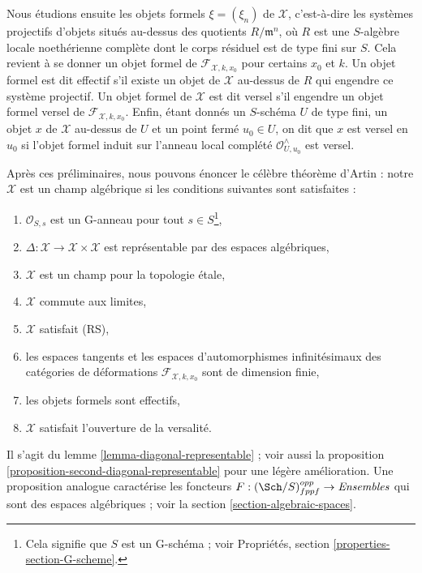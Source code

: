 \medskip\noindent
Nous étudions ensuite les objets formels $\xi = (\xi_n)$ de $\mathcal{X}$, c'est-à-dire les
systèmes projectifs d'objets situés au-dessus des quotients $R/\mathfrak m^n$,
où $R$ est une $S$-algèbre locale noethérienne complète dont le corps résiduel
est de type fini sur $S$. Cela revient à se donner un objet formel
de $\mathcal{F}_{\mathcal{X}, k, x_0}$ pour certains $x_0$ et $k$.
Un objet formel est dit effectif s'il existe un objet de
$\mathcal{X}$ au-dessus de $R$ qui engendre ce système projectif.
Un objet formel de $\mathcal{X}$ est dit versel s'il engendre un
objet formel versel de $\mathcal{F}_{\mathcal{X}, k, x_0}$.
Enfin, étant donnés un $S$-schéma $U$ de type fini, un objet $x$
de $\mathcal{X}$ au-dessus de $U$ et un point fermé $u_0 \in U$, on dit que
$x$ est versel en $u_0$ si l'objet formel induit sur l'anneau local complété
$\mathcal{O}_{U, u_0}^\wedge$ est versel.

\medskip\noindent
Après ces préliminaires, nous pouvons énoncer le célèbre théorème
d'Artin : notre $\mathcal{X}$ est un champ algébrique si les conditions suivantes sont satisfaites :
\begin{enumerate}
\item $\mathcal{O}_{S, s}$ est un G-anneau pour tout $s \in S$\footnote{Cela
signifie que $S$ est un G-schéma ; voir
Propriétés, section \ref{properties-section-G-scheme}.},
\item $\Delta : \mathcal{X} \to \mathcal{X} \times \mathcal{X}$
est représentable par des espaces algébriques,
\item $\mathcal{X}$ est un champ pour la topologie \'etale,
\item $\mathcal{X}$ commute aux limites,
\item $\mathcal{X}$ satisfait (RS),
\item les espaces tangents et les espaces d'automorphismes infinitésimaux
des catégories de déformations $\mathcal{F}_{\mathcal{X}, k, x_0}$
sont de dimension finie,
\item les objets formels sont effectifs,
\item $\mathcal{X}$ satisfait l'ouverture de la versalité.
\end{enumerate}
Il s'agit du lemme \ref{lemma-diagonal-representable} ; voir aussi la
proposition \ref{proposition-second-diagonal-representable}
pour une légère amélioration. Une proposition analogue
caractérise les foncteurs $F : (\Sch/S)_{fppf}^{opp} \to \textit{Ensembles}$
qui sont des espaces algébriques ; voir la section \ref{section-algebraic-spaces}.

